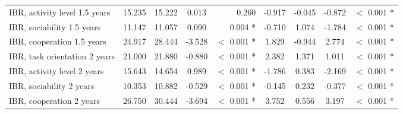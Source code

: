 \begin{tabular}{l c c c r c c c r}
IBR, activity level 1.5 years & 15.235 & 15.222 & 0.013 & 0.260 & -0.917 & -0.045 & -0.872 & $ < $ 0.001 * \\
IBR, sociability 1.5 years & 11.147 & 11.057 & 0.090 & 0.004 * & -0.710 & 1.074 & -1.784 & $ < $ 0.001 * \\
IBR, cooperation 1.5 years & 24.917 & 28.444 & -3.528 & $ < $ 0.001 * & 1.829 & -0.944 & 2.774 & $ < $ 0.001 * \\
IBR, task orientation 2 years & 21.000 & 21.880 & -0.880 & $ < $ 0.001 * & 2.382 & 1.371 & 1.011 & $ < $ 0.001 * \\
IBR, activity level 2 years & 15.643 & 14.654 & 0.989 & $ < $ 0.001 * & -1.786 & 0.383 & -2.169 & $ < $ 0.001 * \\
IBR, sociability 2 years & 10.353 & 10.882 & -0.529 & $ < $ 0.001 * & -0.145 & 0.232 & -0.377 & $ < $ 0.001 * \\
IBR, cooperation 2 years & 26.750 & 30.444 & -3.694 & $ < $ 0.001 * & 3.752 & 0.556 & 3.197 & $ < $ 0.001 * \\
\bottomrule
\end{tabular}
